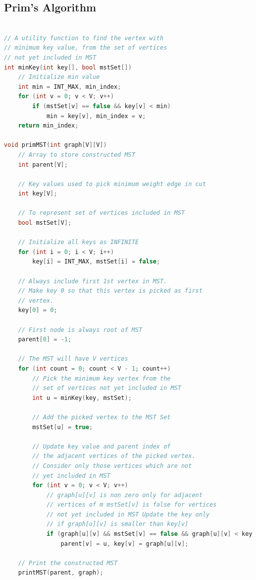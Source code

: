 \documentclass[11pt]{article}
\begin{document}
\subsection{Prim's Algorithm}
\begin{lstlisting}[language=C++]    

// A utility function to find the vertex with
// minimum key value, from the set of vertices
// not yet included in MST
int minKey(int key[], bool mstSet[])
    // Initialize min value
    int min = INT_MAX, min_index;
    for (int v = 0; v < V; v++)
        if (mstSet[v] == false && key[v] < min)
            min = key[v], min_index = v;
    return min_index;

void primMST(int graph[V][V])
    // Array to store constructed MST
    int parent[V];

    // Key values used to pick minimum weight edge in cut
    int key[V];

    // To represent set of vertices included in MST
    bool mstSet[V];

    // Initialize all keys as INFINITE
    for (int i = 0; i < V; i++)
        key[i] = INT_MAX, mstSet[i] = false;

    // Always include first 1st vertex in MST.
    // Make key 0 so that this vertex is picked as first
    // vertex.
    key[0] = 0;

    // First node is always root of MST
    parent[0] = -1;

    // The MST will have V vertices
    for (int count = 0; count < V - 1; count++)
        // Pick the minimum key vertex from the
        // set of vertices not yet included in MST
        int u = minKey(key, mstSet);

        // Add the picked vertex to the MST Set
        mstSet[u] = true;

        // Update key value and parent index of
        // the adjacent vertices of the picked vertex.
        // Consider only those vertices which are not
        // yet included in MST
        for (int v = 0; v < V; v++)
            // graph[u][v] is non zero only for adjacent
            // vertices of m mstSet[v] is false for vertices
            // not yet included in MST Update the key only
            // if graph[u][v] is smaller than key[v]
            if (graph[u][v] && mstSet[v] == false && graph[u][v] < key[v])
                parent[v] = u, key[v] = graph[u][v];

    // Print the constructed MST
    printMST(parent, graph);
\end{lstlisting}
\end{document}
